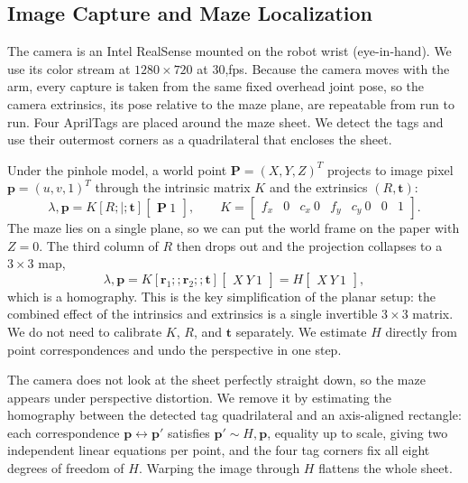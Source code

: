 \documentclass[11pt]{article}
\begin{document}
\subsection{Image Capture and Maze Localization}

The camera is an Intel RealSense mounted on the robot wrist (eye-in-hand). We use its color stream at $1280 \times 720$ at 30,fps. Because the camera moves with the arm, every capture is taken from the same fixed overhead joint pose, so the camera extrinsics, its pose relative to the maze plane, are repeatable from run to run. Four AprilTags are placed around the maze sheet. We detect the tags and use their outermost corners as a quadrilateral that encloses the sheet.

Under the pinhole model, a world point $\mathbf{P} = (X, Y, Z)^T$ projects to image pixel $\mathbf{p} = (u, v, 1)^T$ through the intrinsic matrix $K$ and the extrinsics $(R, \mathbf{t})$:
\begin{equation}
\lambda , \mathbf{p} = K \left[ R ;|; \mathbf{t} \right]
\begin{bmatrix} \mathbf{P} \ 1 \end{bmatrix},
\qquad
K = \begin{bmatrix} f_x & 0 & c_x \ 0 & f_y & c_y \ 0 & 0 & 1 \end{bmatrix}.
\end{equation}
The maze lies on a single plane, so we can put the world frame on the paper with $Z = 0$. The third column of $R$ then drops out and the projection collapses to a $3 \times 3$ map,
\begin{equation}
\lambda , \mathbf{p} = K \left[ \mathbf{r}_1 ;; \mathbf{r}_2 ;; \mathbf{t} \right]
\begin{bmatrix} X \ Y \ 1 \end{bmatrix}
= H \begin{bmatrix} X \ Y \ 1 \end{bmatrix},
\end{equation}
which is a homography. This is the key simplification of the planar setup: the combined effect of the intrinsics and extrinsics is a single invertible $3 \times 3$ matrix. We do not need to calibrate $K$, $R$, and $\mathbf{t}$ separately. We estimate $H$ directly from point correspondences and undo the perspective in one step.

The camera does not look at the sheet perfectly straight down, so the maze appears under perspective distortion. We remove it by estimating the homography between the detected tag quadrilateral and an axis-aligned rectangle: each correspondence $\mathbf{p} \leftrightarrow \mathbf{p}'$ satisfies $\mathbf{p}' \sim H , \mathbf{p}$, equality up to scale, giving two independent linear equations per point, and the four tag corners fix all eight degrees of freedom of $H$. Warping the image through $H$ flattens the whole sheet.
\end{document}
